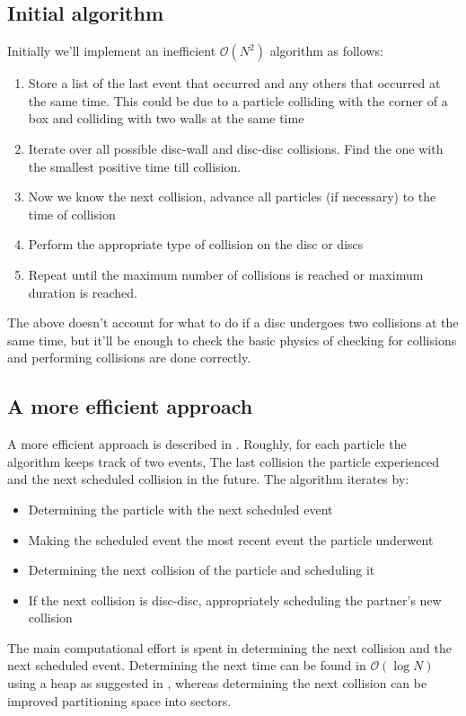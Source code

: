 \documentclass{article}
\begin{document}
\subsection{Initial algorithm}
Initially we'll implement an inefficient $\mathcal{O}(N^2)$ algorithm as follows:
\begin{enumerate}
    \item Store a list of the last event that occurred and any others that occurred at the same time. This could be due to a particle colliding with the corner of a box and colliding with two walls at the same time
    \item Iterate over all possible disc-wall and disc-disc collisions. Find the one with the smallest positive time till collision.
    \item Now we know the next collision, advance all particles (if necessary) to the time of collision
    \item Perform the appropriate type of collision on the disc or discs
    \item Repeat until the maximum number of collisions is reached or maximum duration is reached.
\end{enumerate}
The above doesn't account for what to do if a disc undergoes two collisions at the same time, but it'll be enough to check the basic physics of checking for collisions and performing collisions are done correctly.

\subsection{A more efficient approach}
A more efficient approach is described in \cite{Lubachevsky-1991}. Roughly, for each particle the algorithm keeps track of two events, The last collision the particle experienced and the next scheduled collision in the future. The algorithm iterates by:
\begin{itemize}
    \item Determining the particle with the next scheduled event
    \item Making the scheduled event the most recent event the particle underwent 
    \item Determining the next collision of the particle and scheduling it
    \item If the next collision is disc-disc, appropriately scheduling the partner's new collision
\end{itemize}
The main computational effort is spent in determining the next collision and the next scheduled event. Determining the next time can be found in $\mathcal{O}(\log N)$ using a heap as suggested in \cite{Lubachevsky-1991}, whereas determining the next collision can be improved partitioning space into sectors.



\end{document}
